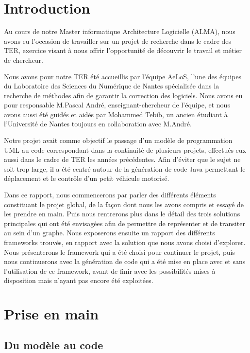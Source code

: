 \documentclass[french, 12pt, a4paper]{article}
\begin{document}
\newpage
\tableofcontents
\newpage

\section{Introduction}

Au cours de notre Master informatique Architecture Logicielle (ALMA), nous avons eu l'occasion de travailler sur un projet de recherche dans le cadre des TER,
exercice visant à nous offrir l'opportunité de découvrir le travail et métier de chercheur.

Nous avons pour notre TER été accueillis par l'équipe AeLoS, l'une des équipes du Laboratoire des Sciences du Numérique de Nantes spécialisée dans la recherche de méthodes afin de garantir la correction des logiciels. Nous avons eu pour responsable M.Pascal André, enseignant-chercheur de l'équipe, et nous avons aussi été guidés et aidés par Mohammed Tebib, un ancien étudiant à l'Université de Nantes toujours en collaboration avec M.André.

Notre projet avait comme objectif le passage d'un modèle de programmation UML au code correspondant dans la continuité de plusieurs projets, effectués eux aussi dans le cadre de TER les années précédentes.
Afin d'éviter que le sujet ne soit trop large, il a été centré autour de la génération de code Java permettant le déplacement et le contrôle d'un petit véhicule motorisé.
\bigskip

Dans ce rapport, nous commencerons par parler des différents éléments constituant le projet global, de la façon dont nous les avons compris et essayé de les prendre en main. Puis nous rentrerons plus dans le détail des trois solutions principales qui ont été envisagées afin de permettre de représenter et de transiter au sein d'un graphe. Nous exposerons ensuite un rapport des différents frameworks trouvés, en rapport avec la solution que nous avons choisi d'explorer. Nous présenterons le framework qui a été choisi pour continuer le projet, puis nous continuerons avec la génération de code qui a été mise en place avec et sans l'utilisation de ce framework, avant de finir avec les possibilités mises à disposition mais n'ayant pas encore été exploitées.


\section{Prise en main}
    \subsection{Du modèle au code}
\end{document}
